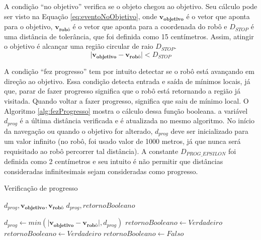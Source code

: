 		
		
		A condição ``no objetivo'' verifica se o objeto chegou ao objetivo. Seu cálculo pode
		ser visto na Equação \ref{eq:eventoNoObjetivo}, onde $\mathbf{v_{objetivo}}$ é o vetor 
		que aponta para o objetivo, $\mathbf{v_{\text{robô}}}$ é o vetor que aponta para a coordenada 
		do robô e $D_{STOP}$ é uma distância de tolerância, que foi definida como 15 centímetros. 
		Assim, atingir o objetivo é alcançar uma região circular de raio $D_{STOP}$.
		\begin{equation}
			\label{eq:eventoNoObjetivo}
			\mid \mathbf{v_{\text{objetivo}}} - \mathbf{v_{\text{robô}}} \mid < D_{STOP}
		\end{equation}
		
		A condição ``fez progresso'' tem por intuito detectar se o robô está avançando em 
		direção ao objetivo. Essa condição detecta entrada e saída de mínimos locais, já que, 
		parar de fazer progresso significa que o robô está retornando a região já visitada. Quando
		voltar a fazer progresso, significa que saiu de mínimo local. O Algoritmo 
		\ref{alg:fezProgresso} mostra o cálculo dessa função booleana. a variável $d_{prog}$ é a última distância 
		verificada e é atualizada no mesmo algoritmo. No início da navegação ou quando o objetivo
		for alterado, $d_{prog}$ deve ser inicializado para um valor infinito (no robô, foi usado 
		valor de 1000 metros, já que nunca será requisitado ao robô percorrer tal distância). A 
		constante $D_{PROG\_EPSILON}$ foi definida como 2 centímetros e seu intuito é não permitir
		que distâncias consideradas infinitesimais sejam consideradas como progresso.
		\begin{algorithm}
		\caption{Verificação de progresso}
		\label{alg:fezProgresso}%
		\begin{algorithmic}[1]
	
		\REQUIRE $d_{prog}, \mathbf{v_{\text{objetivo}}}, \mathbf{v_{\text{robô}}}$
		\ENSURE $d_{prog}, retornoBooleano$
	
			\STATE $d_{prog} \leftarrow min(\mid \mathbf{v_{\text{objetivo}}} - \mathbf{v_{\text{robô}}} \mid, d_{prog})$
			\STATE $retornoBooleano \leftarrow Verdadeiro$
			\STATE $retornoBooleano \leftarrow Verdadeiro$
		\ELSE
			\STATE $retornoBooleano \leftarrow Falso$ 
		\ENDIF
	
		\end{algorithmic}
		\end{algorithm}
	
